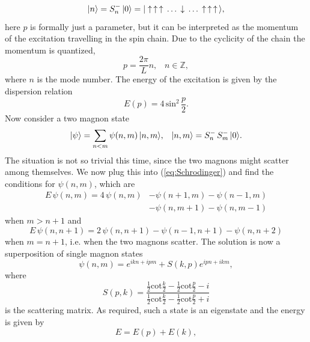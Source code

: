 \begin{equation}
	|n\rangle = S^-_n \, |0\rangle = |\uparrow \, \uparrow \, \uparrow \, \dots \, \downarrow \, \dots \, \uparrow \, \uparrow \, \uparrow \,\rangle,
\end{equation}
here $p$ is formally just a parameter, but it can be interpreted as the momentum of the excitation travelling in the spin chain. 
Due to the cyclicity of the chain the momentum is quantized,
\begin{equation}
	p = \frac{2\pi}{L} n, \,\,\,\,\, n \in \mathbb{Z},
\end{equation}
where $n$ is the mode number. 
The energy of the excitation is given by the dispersion relation
\begin{equation}
	E(p) = 4 \, \mathrm{sin}^2 \, \frac{p}{2}.
	\label{eq:magnon_energy}
\end{equation}
Now consider a two magnon state
\begin{equation}
	|\psi\rangle = \sum_{n<m} \psi(n, m) \, |n,m\rangle,  \,\,\,\,\, |n,m\rangle = S^-_n \, S^-_m \, |0\rangle.
\end{equation}
The situation is not so trivial this time, since the two magnons might scatter among themselves. We now plug this into (\ref{eq:Schrodinger}) and find the conditions for $\psi(n,m)$, which are
\begin{equation}
\begin{split}
	E \, \psi(n,m) = 4 \, \psi(n,m) & -  \psi(n+1,m)  -  \psi(n-1,m) \\ 
	                              & -  \psi(n, m+1)  -  \psi(n, m-1)
\end{split}
\end{equation}
when $m > n+1$ and
\begin{equation}
	E \, \psi(n, n+1) = 2 \, \psi(n, n+1) - \psi(n-1, n+1) - \psi(n, n+2)
\end{equation}
when $m = n+1$, i.e. when the two magnons scatter. 
The solution is now a superposition of single magnon states
\begin{equation}
	\psi(n,m) = e^{ikn + ipm} + S(k,p) e^{ipn + ikm},
\end{equation}
where
\begin{equation}
	S(p,k) = \frac{\frac{1}{2} \mathrm{cot} \frac{k}{2} - \frac{1}{2} \mathrm{cot} \frac{p}{2} - i}{\frac{1}{2} \mathrm{cot} \frac{k}{2} - \frac{1}{2} \mathrm{cot} \frac{p}{2} + i}
\end{equation}
is the scattering matrix. 
As required, such a state is an eigenstate and the energy is given by
\begin{equation}
	E = E(p) + E(k),
\end{equation}
